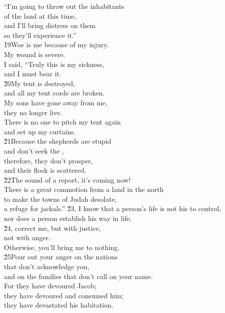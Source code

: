 \begin{poetry}
\poeml ``I'm going to throw out the inhabitants \\
\poemll    of the land at this time, \\
\poeml and I'll bring distress on them \\
\poemll    so they'll experience it.'' \\
\poeml \v{19}Woe is me because of my injury. \\
\poemll    My wound is severe. \\
\poeml I said, ``Truly this is my sickness, \\
\poemll    and I must bear it. \\
\poeml \v{20}My tent is destroyed, \\
\poemll    and all my tent cords are broken. \\
\poeml My sons have gone away from me, \\
\poemll    they no longer live. \\
\poeml There is no one to pitch my tent again \\
\poemll    and set up my curtains. \\
\poeml \v{21}Because the shepherds are stupid \\
\poemll    and don't seek the , \\
\poeml therefore, they don't prosper, \\
\poemll    and their flock is scattered. \\
\poeml \v{22}The sound of a report, it's coming now! \\
\poemll    There is a great commotion from a land in the north \\
\poeml to make the towns of Judah desolate, \\
\poemll    a refuge for jackals.''
\poeml \v{23}, I know that a person's life is not his to control, \\
\poemll    nor does a person establish his way in life. \\
\poeml \v{24}, correct me, but with justice, \\
\poemll    not with anger. \\
\poemlll       Otherwise, you'll bring me to nothing. \\
\poeml \v{25}Pour out your anger on the nations \\
\poemll    that don't acknowledge you, \\
\poemlll       and on the families that don't call on your name. \\
\poeml For they have devoured Jacob; \\
\poemll    they have devoured and consumed him; \\
\poemlll       they have devastated his habitation.
\end{poetry}

